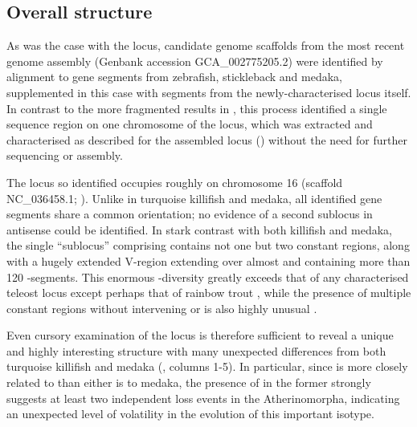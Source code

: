 \subsection{Overall structure}
\label{sec:xma-locus-structure}
	
As was the case with the \Nfu \igh{} locus, candidate genome scaffolds from the most recent \xma genome assembly (Genbank accession GCA\_002775205.2) were identified by alignment to \igh{} gene segments from zebrafish, stickleback and medaka, supplemented in this case with segments from the newly-characterised \Nfu locus itself. In contrast to the more fragmented results in \Nfu, this process identified a single sequence region on one chromosome of the \Xma locus, which was extracted and characterised as described for the assembled \Nfu locus () without the need for further sequencing or assembly.

The \Xma \igh{} locus so identified occupies roughly  on chromosome 16 (scaffold NC\_036458.1; ). Unlike in turquoise killifish and medaka, all identified gene segments share a common orientation; no evidence of a second sublocus in antisense could be identified. In stark contrast with both killifish and medaka, the single ``sublocus'' comprising \Xma \igh{} contains not one but two  constant regions, along with a hugely extended V-region extending over almost  and containing more than 120 \vh-segments. This enormous \vh-diversity greatly exceeds that of any characterised teleost \igh{} locus except perhaps that of rainbow trout \parencite{bengten2015fishantibodies}, while the presence of multiple  constant regions without intervening  or  is also highly unusual \parencite{fillatreau2013astonishing}. 

Even cursory examination of the \Xma \igh{} locus is therefore sufficient to reveal a unique and highly interesting structure with many unexpected differences from both turquoise killifish and medaka (, columns 1-5). In particular, since \Xma is more closely related to \Nfu than either is to medaka, the presence of  in the former strongly suggests at least two independent loss events in the Atherinomorpha, indicating an unexpected level of volatility in the evolution of this important isotype.
 
